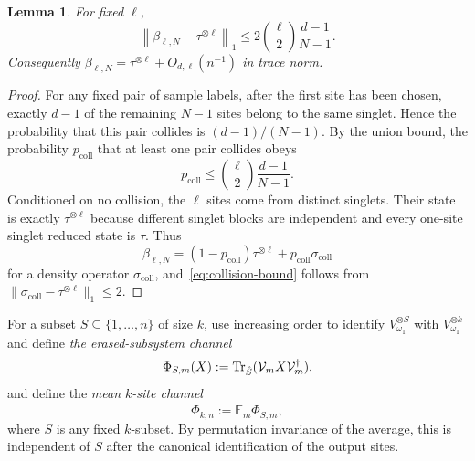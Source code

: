 \documentclass[11pt,letterpaper]{article}
\theoremstyle{plain}
\theoremstyle{plain}
\theoremstyle{plain}
\theoremstyle{plain}
\theoremstyle{plain}
\theoremstyle{plain}
\theoremstyle{plain}
\newtheorem{smlemma}[smtheorem]{Lemma}
\theoremstyle{definition}
\theoremstyle{plain}
\begin{document}
\begin{smlemma}
\label{lem:collision}
For fixed $\ell$,
\begin{equation}
\label{eq:collision-bound}
  \left\|\beta_{\ell,N}-\tau^{\otimes\ell}\right\|_1
  \le
  2\binom\ell2\frac{d-1}{N-1}.
\end{equation}
Consequently $\beta_{\ell,N}=\tau^{\otimes\ell}+O_{d,\ell}(n^{-1})$ in trace norm.
\end{smlemma}

\begin{proof}
For any fixed pair of sample labels, after the first site has been chosen, exactly $d-1$ of the remaining $N-1$ sites belong to the same singlet. 
Hence the probability that this pair collides is $(d-1)/(N-1)$. By the union bound, the probability $p_{\mathrm{coll}}$ that at least one pair collides obeys
\[
  p_{\mathrm{coll}}
  \le\binom\ell2\frac{d-1}{N-1}.
\]
Conditioned on no collision, the $\ell$ sites come from distinct singlets. Their state is exactly $\tau^{\otimes\ell}$ because different singlet blocks are independent and every one-site singlet reduced state is $\tau$.
Thus
\[
  \beta_{\ell,N}
  =(1-p_{\mathrm{coll}})\tau^{\otimes\ell}
    +p_{\mathrm{coll}}\sigma_{\mathrm{coll}}
\]
for a density operator $\sigma_{\mathrm{coll}}$, and~\eqref{eq:collision-bound} follows from $\|\sigma_{\mathrm{coll}}-\tau^{\otimes\ell}\|_1\le2$.
\end{proof}

For a subset $S\subseteq\{1,\ldots,n\}$ of size $k$, use increasing order to identify $V_{\omega_1}^{\otimes S}$ with $V_{\omega_1}^{\otimes k}$ and define \textit{the erased-subsystem channel}
\begin{equation}
\label{eq:local-channel}
  \Phi_{S,m}(X)
  :=\Tr_{\hat S}(\mathcal{V}_mX\mathcal{V}_m^\dagger).
\end{equation}
and define the \textit{mean $k$-site channel}
\[
  \overline\Phi_{k,n}
  :=\mathbb{E}_m\Phi_{S,m},
\]
where $S$ is any fixed $k$-subset. By permutation invariance of the average, this is independent of $S$ after the canonical identification of the output sites.
\end{document}
